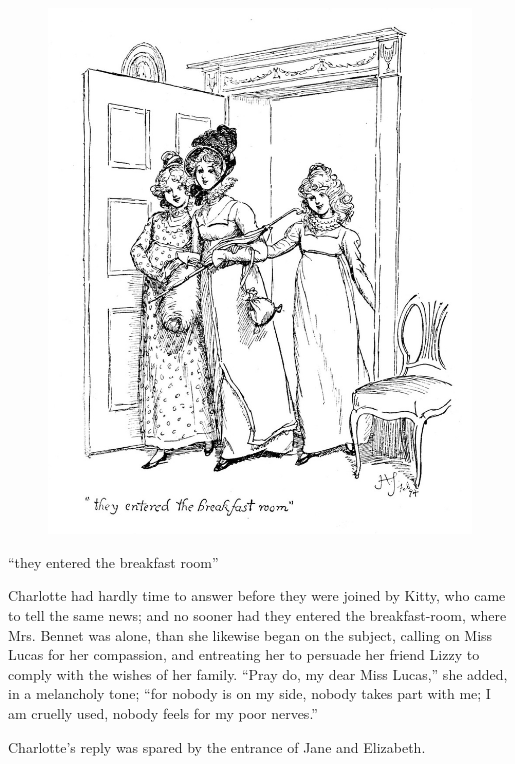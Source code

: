 \documentclass[10pt]{book}
\begin{document}
\begin{figure}[h]
\centering
\includegraphics[width=\linewidth]{images/i_172.jpg}
\end{figure}

     “they entered the breakfast room”
    

   Charlotte had hardly time to answer before they were joined by Kitty,
who came to tell the same news; and no sooner had they entered the
breakfast-room, where Mrs. Bennet was alone, than she likewise began on
the subject, calling on Miss Lucas for her compassion, and entreating
her to persuade her friend Lizzy to comply with the wishes of her
family. “Pray do, my dear Miss
   Lucas,” she added, in a melancholy tone;
“for nobody is on my side, nobody takes part with me; I am cruelly used,
nobody feels for my poor nerves.”
  

   Charlotte’s reply was spared by the entrance of Jane and Elizabeth.
  
\end{document}
